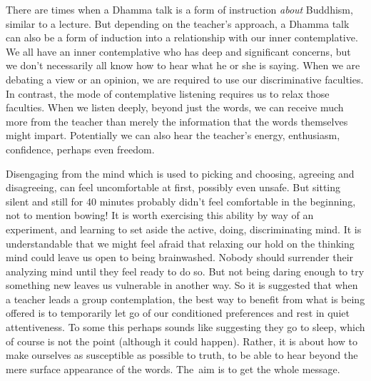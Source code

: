 There are times when a Dhamma talk is a form of instruction \emph{about}
Buddhism, similar to a lecture. But depending on the teacher’s approach,
a Dhamma talk can also be a form of induction into a relationship with
our inner contemplative. We all have an inner contemplative who has deep
and significant concerns, but we don’t necessarily all know how to hear
what he or she is saying. When we are debating a view or an opinion, we
are required to use our discriminative faculties. In contrast, the mode
of contemplative listening requires us to relax those faculties. When we
listen deeply, beyond just the words, we can receive much more from the
teacher than merely the information that the words themselves might
impart. Potentially we can also hear the teacher’s energy, enthusiasm,
confidence, perhaps even freedom.

Disengaging from the mind which is used to picking and choosing,
agreeing and disagreeing, can feel uncomfortable at first, possibly even
unsafe. But sitting silent and still for 40 minutes probably didn’t feel
comfortable in the beginning, not to mention bowing! It is worth
exercising this ability by way of an experiment, and learning to set
aside the active, doing, discriminating mind. It is understandable that
we might feel afraid that relaxing our hold on the thinking mind could
leave us open to being brainwashed. Nobody should surrender their
analyzing mind until they feel ready to do so. But not being daring
enough to try something new leaves us vulnerable in another way. So it
is suggested that when a teacher leads a group contemplation, the best
way to benefit from what is being offered is to temporarily let go of
our conditioned preferences and rest in quiet attentiveness. To some
this perhaps sounds like suggesting they go to sleep, which of course is
not the point (although it could happen). Rather, it is about how to
make ourselves as susceptible as possible to truth, to be able to hear
beyond the mere surface appearance of the words. The~aim is to get the
whole message.

